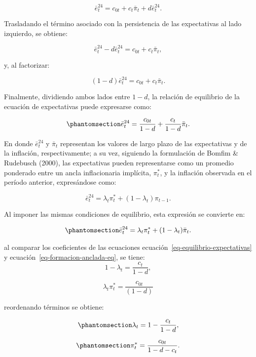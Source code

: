 \documentclass[
  10.5pt,
  letterpaper,
  twocolumn]{article}
\begin{document}
\[
\bar e_t^{24}
=
c_{0t}
+
c_t\bar\pi_t
+
d\bar e_t^{24}.
\]

Trasladando el término asociado con la persistencia de las expectativas
al lado izquierdo, se obtiene:

\[
\bar e_t^{24}
-
d\bar e_t^{24}
=
c_{0t}
+
c_t\bar\pi_t,
\]

y, al factorizar:

\[
(1-d)\bar e_t^{24}
=
c_{0t}
+
c_t\bar\pi_t.
\]

Finalmente, dividiendo ambos lados entre \(1-d\), la relación de
equilibrio de la ecuación de expectativas puede expresarse como:

\begin{equation}\phantomsection\label{eq-equilibrio-expectativas}{
\bar e_t^{24}
=
\frac{c_{0t}}{1-d}
+
\frac{c_t}{1-d}\bar\pi_t.
}\end{equation}

En donde \(\bar e_t^{24}\) y \(\bar\pi_t\) representan los valores de
largo plazo de las expectativas y de la inflación, respectivamente; a su
vez, siguiendo la formulación de Bomfim \& Rudebusch (2000), las
expectativas pueden representarse como un promedio ponderado entre un
ancla inflacionaria implícita, \(\pi_t^{*}\), y la inflación observada
en el período anterior, expresándose como:

\[\bar e_t^{24}=\lambda_t\pi_t^{*}+(1-\lambda_t)\pi_{t-1}.\]

Al imponer las mismas condiciones de equilibrio, esta expresión se
convierte en:

\begin{equation}\phantomsection\label{eq-formacion-anclada-eq}{
\bar e_t^{24}
=
\lambda_t\pi_t^{*}
+
(1-\lambda_t)\bar\pi_t.
}\end{equation}

al comparar los coeficientes de las ecuaciones
ecuación~\ref{eq-equilibrio-expectativas} y
ecuación~\ref{eq-formacion-anclada-eq}, se
tiene:\[1 - \lambda_t=\frac{c_t}{1 - d},\]

\[\lambda_t\pi_t^{*}=\frac{c_{0t}}{(1-d)}\]

reordenando términos se obtiene:

\begin{equation}\phantomsection\label{eq-lambda}{\lambda_t=1-\frac{c_t}{1-d},}\end{equation}

\begin{equation}\phantomsection\label{eq-ancla-implicita}{\pi_t^{*}=\frac{c_{0t}}{1-d-c_t}.}\end{equation}
\end{document}
